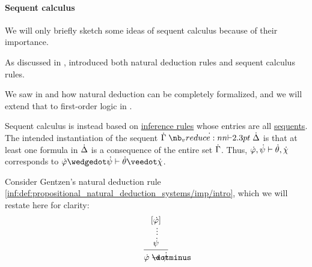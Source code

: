\paragraph{Sequent calculus}\hfill

We will only briefly sketch some ideas of sequent calculus because of their importance.

\begin{remark}\label{rem:sequent_calculus}
  As discussed in ,  introduced both natural deduction rules and sequent calculus rules.

  We saw in  and  how natural deduction can be completely formalized, and we will extend that to first-order logic in .

  Sequent calculus is instead based on \hyperref[def:inference_rule]{inference rules} whose entries are all \hyperref[def:sequent]{sequents}. The intended instantiation of the sequent  \( \syn\Gamma \synvdash \syn\Delta \) is that at least one formula in \( \dot{\Delta} \) is a consequence of the entire set \( \dot{\Gamma} \). Thus, \( \dot{\varphi}, \dot{\psi} \vdash \dot{\theta}, \dot{\chi} \) corresponds to \( \syn\varphi \synwedge \syn\psi \vdash \syn\theta \synvee \syn\chi \).

  Consider Gentzen's natural deduction rule \ref{inf:def:propositional_natural_deduction_systems/imp/intro}, which we will restate here for clarity:
  \begin{equation*}
    \begin{prooftree}
      \hypo{ [\syn\varphi] }
      \ellipsis {} { \syn\psi }
      \infer1{ \syn\varphi \synimplies \syn\psi }
    \end{prooftree}
  \end{equation*}


\end{remark}

